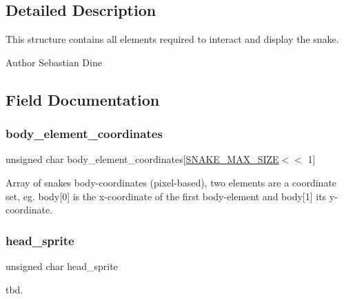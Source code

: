 \subsection{Detailed Description}
This structure contains all elements required to interact and display the snake. 

\begin{DoxyAuthor}{Author}
Sebastian Dine 
\end{DoxyAuthor}


\subsection{Field Documentation}
\hypertarget{structsnake__struct_a951e67290252c2a8d5ed463ce30d2743}{}\label{structsnake__struct_a951e67290252c2a8d5ed463ce30d2743} 
\subsubsection{\texorpdfstring{body\+\_\+element\+\_\+coordinates}{body\_element\_coordinates}}
{\footnotesize\ttfamily unsigned char body\+\_\+element\+\_\+coordinates\mbox{[}\hyperlink{macros_8h_a6fb1d4c78b46a621cb8344c51adcdc02}{S\+N\+A\+K\+E\+\_\+\+M\+A\+X\+\_\+\+S\+I\+ZE}$<$$<$ 1\mbox{]}}

Array of snakes body-\/coordinates (pixel-\/based), two elements are a coordinate set, eg. body\mbox{[}0\mbox{]} is the x-\/coordinate of the first body-\/element and body\mbox{[}1\mbox{]} its y-\/coordinate. \hypertarget{structsnake__struct_afebbff4a86a6b768aa89eb81da9b0611}{}\label{structsnake__struct_afebbff4a86a6b768aa89eb81da9b0611} 
\subsubsection{\texorpdfstring{head\+\_\+sprite}{head\_sprite}}
{\footnotesize\ttfamily unsigned char head\+\_\+sprite}

tbd. \hypertarget{structsnake__struct_aee3e536edc6d71b7578c751509573500}{}\label{structsnake__struct_aee3e536edc6d71b7578c751509573500} 
